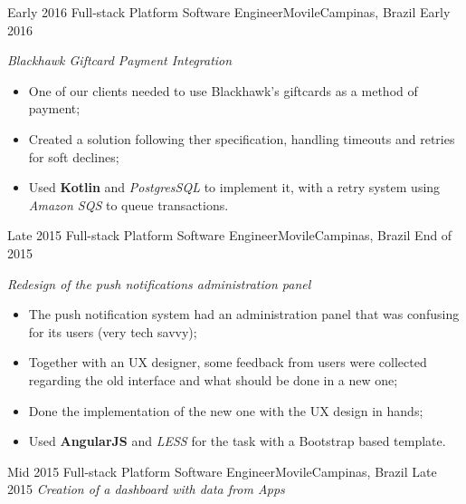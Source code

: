 %
%
%


\begin{experiences}
  \experience
  {Early 2016} {Full-stack Platform Software Engineer}{Movile}{Campinas, Brazil}
  {Early 2016}
        {
        \emph{Blackhawk Giftcard Payment Integration}\\
          \begin{itemize}
            \item One of our clients needed to use Blackhawk's giftcards as a method of payment;
            \item Created a solution following ther specification, handling timeouts and retries for soft declines;
            \item Used \textbf{Kotlin} and \emph{PostgresSQL} to implement it, with a retry system using \emph{Amazon SQS} to queue transactions.\\ 
          \end{itemize}
        }{}
  \experience
  {Late 2015} {Full-stack Platform Software Engineer}{Movile}{Campinas, Brazil}
  {End of 2015}
        {
        \emph{Redesign of the push notifications administration panel}\\
          \begin{itemize}
            \item The push notification system had an administration panel that was confusing for its users (very tech savvy);
            \item Together with an UX designer, some feedback from users were collected regarding the old interface and what should be done in a new one;
            \item Done the implementation of the new one with the UX design in hands;
            \item Used \textbf{AngularJS} and \emph{LESS} for the task with a Bootstrap based template.\\ 
          \end{itemize}
        }{}
  \experience
  {Mid 2015} {Full-stack Platform Software Engineer}{Movile}{Campinas, Brazil}
  {Late 2015}
        {
        \emph{Creation of a dashboard with data from Apps}\\
}
\end{experiences}
